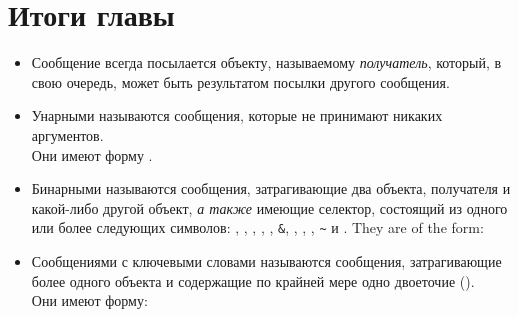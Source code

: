 \documentclass[a4paper,10pt,twoside]{book}
\begin{document}
\section{Итоги главы}
\begin{itemize}
\item Сообщение всегда посылается объекту, называемому \emph{получатель}, который, в свою очередь, может быть результатом посылки другого сообщения.

\item Унарными называются сообщения, которые не принимают никаких аргументов.\\
Они имеют форму .

\item Бинарными называются сообщения, затрагивающие два объекта, получателя и какой-либо другой объект, \emph{а также} имеющие селектор, состоящий из одного или более следующих символов: \ct{+}, \ct{-}, \ct{*}, \ct{/}, \ct{|}, \texttt{\&}, \ct{=}, \ct{>}, \ct{<}, \texttt{\~} и .
They are of the form: 
\item Сообщениями с ключевыми словами называются сообщения, затрагивающие более одного объекта и содержащие по крайней мере одно двоеточие (\ct{:}). \\
Они имеют форму:


\end{itemize}
\end{document}
